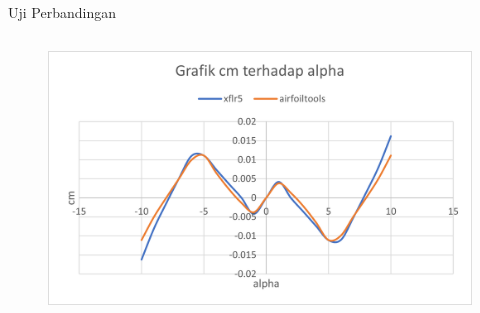 \begin{frame}{Uji Perbandingan}
\begin{columns}[t]
    \begin{column}{.33\linewidth}
      \begin{figure}[h]
        \centering
        \includegraphics[width=0.8\linewidth]{statics/plot_naca0009_cma}
      \end{figure}
    \end{column}
  \end{columns}
\end{frame}
